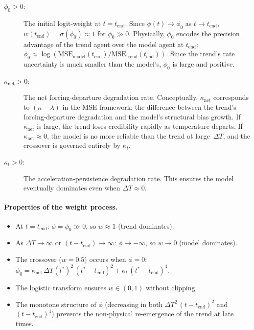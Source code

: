\documentclass[11pt]{article}
\newcommand{\dT}{\Delta T}
\newcommand{\tend}{t_{\mathrm{end}}}
\newcommand{\MSEtrend}{\mathrm{MSE}_{\mathrm{trend}}}
\newcommand{\MSEmodel}{\mathrm{MSE}_{\mathrm{model}}}
\begin{document}
\begin{description}
  \item[$\phi_0 > 0$:] The initial logit-weight at $t = \tend$.  Since $\phi(t) \to \phi_0$ as $t \to \tend$, $w(\tend) = \sigma(\phi_0) \approx 1$ for $\phi_0 \gg 0$.  Physically, $\phi_0$ encodes the precision advantage of the trend agent over the model agent at $\tend$: $\phi_0 \approx \log(\MSEmodel(\tend) / \MSEtrend(\tend))$.  Since the trend's rate uncertainty is much smaller than the model's, $\phi_0$ is large and positive.

  \item[$\kappa_{\mathrm{net}} > 0$:] The net forcing-departure degradation rate.  Conceptually, $\kappa_{\mathrm{net}}$ corresponds to $(\kappa - \lambda)$ in the MSE framework: the difference between the trend's forcing-departure degradation and the model's structural bias growth.  If $\kappa_{\mathrm{net}}$ is large, the trend loses credibility rapidly as temperature departs.  If $\kappa_{\mathrm{net}} \approx 0$, the model is no more reliable than the trend at large~$\dT$, and the crossover is governed entirely by $\kappa_t$.

  \item[$\kappa_t > 0$:] The acceleration-persistence degradation rate.  This ensures the model eventually dominates even when $\dT \approx 0$.
\end{description}

\paragraph{Properties of the weight process.}
\begin{itemize}
  \item At $t = \tend$: $\phi = \phi_0 \gg 0$, so $w \approx 1$ (trend dominates).
  \item As $\dT \to \infty$ or $(t - \tend) \to \infty$: $\phi \to -\infty$, so $w \to 0$ (model dominates).
  \item The crossover ($w = 0.5$) occurs when $\phi = 0$: $\phi_0 = \kappa_{\mathrm{net}}\,\dT(t^*)^2\,(t^* - \tend)^2 + \kappa_t\,(t^* - \tend)^4$.
  \item The logistic transform ensures $w \in (0, 1)$ without clipping.
  \item The monotone structure of $\phi$ (decreasing in both $\dT^2\,(t-\tend)^2$ and $(t-\tend)^4$) prevents the non-physical re-emergence of the trend at late times.
\end{itemize}
\end{document}
